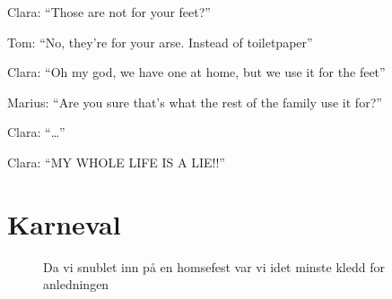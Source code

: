 \begin{dialogue}
	\item Clara: ``Those are not for your feet?''\\
	\item Tom: ``No, they're for your arse. Instead of
		toiletpaper''\\
	\item Clara: ``Oh my god, we have one at home, but we use it
		for the feet''\\
	\item Marius: ``Are you sure that's what the rest of the
		family use it for?''\\
	\item Clara: ``\ldots''\\
	\item Clara: ``MY WHOLE LIFE IS A LIE!!''\\
\end{dialogue}
\begin{figure}[H]
	\vspace{-2.5cm}
	\centering
	\noindent{}
\caption*{}
	\label{fig:doise}
\end{figure}
	\thispagestyle{empty}
\begin{figure}[H]
	\vspace{-2.5cm}
	\centering
	\noindent{}
	\caption*{}
	\label{fig:doishoyre}
\end{figure}
\clearpage
\section{Karneval}

\begin{figure}[H]
	\centering

\noindent{}
	\caption*{Da vi snublet inn på en homsefest var vi idet minste
	kledd for anledningen}
	\label{fig:homsebloko}
\end{figure}


